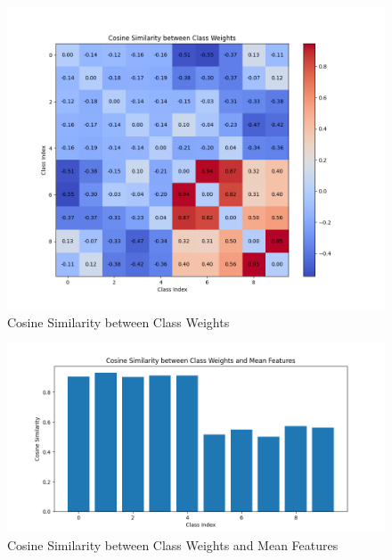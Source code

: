\documentclass{article}
\begin{document}
\begin{multicols}{2}
\columnbreak
\begin{figure}[H]
\centering
\includegraphics[width=\linewidth]{Plot/CE/stage--1/cos_VS_5000_50_epoch_199.png}
\caption{Cosine Similarity between Class Weights}
\end{figure}
\begin{figure}[H]
\centering
\includegraphics[width=\linewidth]{Plot/CE/stage--1/Wi_Hi_cos_VS_5000_50_epoch_199.png}
\caption{Cosine Similarity between Class Weights and Mean Features}
\end{figure}

\end{multicols} %

\newpage
\end{document}

